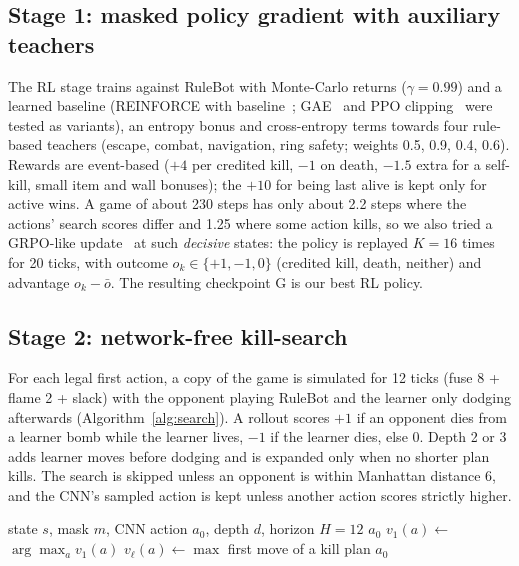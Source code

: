 \documentclass[conference]{IEEEtran}
\begin{document}
\subsection{Stage 1: masked policy gradient with auxiliary teachers}
The RL stage trains against RuleBot with Monte-Carlo returns ($\gamma=0.99$) and a learned baseline (REINFORCE with baseline~\cite{williams1992reinforce}; GAE~\cite{schulman2016gae} and PPO clipping~\cite{schulman2017ppo} were tested as variants), an entropy bonus and cross-entropy terms towards four rule-based teachers (escape, combat, navigation, ring safety; weights 0.5, 0.9, 0.4, 0.6). Rewards are event-based ($+4$ per credited kill, $-1$ on death, $-1.5$ extra for a self-kill, small item and wall bonuses); the $+10$ for being last alive is kept only for active wins. A game of about 230 steps has only about 2.2 steps where the actions' search scores differ and 1.25 where some action kills, so we also tried a GRPO-like update~\cite{shao2024grpo} at such \emph{decisive} states: the policy is replayed $K=16$ times for 20 ticks, with outcome $o_k\in\{+1,-1,0\}$ (credited kill, death, neither) and advantage $o_k-\bar o$. The resulting checkpoint G is our best RL policy.

\subsection{Stage 2: network-free kill-search}
For each legal first action, a copy of the game is simulated for 12 ticks (fuse 8 + flame 2 + slack) with the opponent playing RuleBot and the learner only dodging afterwards (Algorithm~\ref{alg:search}). A rollout scores $+1$ if an opponent dies from a learner bomb while the learner lives, $-1$ if the learner dies, else 0. Depth 2 or 3 adds learner moves before dodging and is expanded only when no shorter plan kills. The search is skipped unless an opponent is within Manhattan distance 6, and the CNN's sampled action is kept unless another action scores strictly higher.

\begin{algorithm}[t]
\caption{Kill-search of depth $d$ (play time)}
\label{alg:search}
\small
\begin{algorithmic}[1]
\Require state $s$, mask $m$, CNN action $a_0$, depth $d$, horizon $H=12$
 \Return $a_0$ \EndIf
{}
  \State $v_1(a)\gets$  
\EndFor
{} \Return $\arg\max_a v_1(a)$ \EndIf
{} 
    \State $v_\ell(a)\gets\max$ 
  \EndFor
   \Return first move of a kill plan \EndIf
\EndFor
\State \Return $a_0$
\end{algorithmic}
\end{algorithm}
\end{document}
